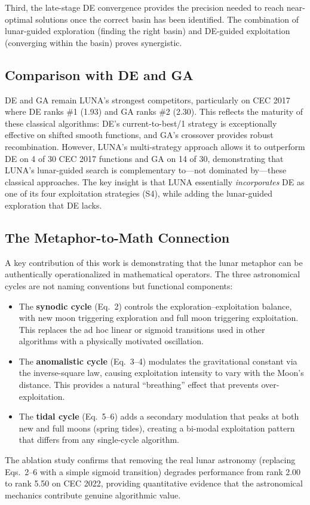 \documentclass[11pt,a4paper]{article}
\begin{document}
Third, the late-stage DE convergence provides the precision needed to reach near-optimal solutions once the correct basin has been identified. The combination of lunar-guided exploration (finding the right basin) and DE-guided exploitation (converging within the basin) proves synergistic.

\subsection{Comparison with DE and GA}

DE and GA remain LUNA's strongest competitors, particularly on CEC 2017 where DE ranks \#1 (1.93) and GA ranks \#2 (2.30). This reflects the maturity of these classical algorithms: DE's current-to-best/1 strategy is exceptionally effective on shifted smooth functions, and GA's crossover provides robust recombination. However, LUNA's multi-strategy approach allows it to outperform DE on 4 of 30 CEC 2017 functions and GA on 14 of 30, demonstrating that LUNA's lunar-guided search is complementary to---not dominated by---these classical approaches. The key insight is that LUNA essentially \emph{incorporates} DE as one of its four exploitation strategies (S4), while adding the lunar-guided exploration that DE lacks.

\subsection{The Metaphor-to-Math Connection}

A key contribution of this work is demonstrating that the lunar metaphor can be authentically operationalized in mathematical operators. The three astronomical cycles are not naming conventions but functional components:
\begin{itemize}[leftmargin=1.5em]
\item The \textbf{synodic cycle} (Eq.~2) controls the exploration--exploitation balance, with new moon triggering exploration and full moon triggering exploitation. This replaces the ad hoc linear or sigmoid transitions used in other algorithms with a physically motivated oscillation.
\item The \textbf{anomalistic cycle} (Eq.~3--4) modulates the gravitational constant via the inverse-square law, causing exploitation intensity to vary with the Moon's distance. This provides a natural ``breathing'' effect that prevents over-exploitation.
\item The \textbf{tidal cycle} (Eq.~5--6) adds a secondary modulation that peaks at both new and full moons (spring tides), creating a bi-modal exploitation pattern that differs from any single-cycle algorithm.
\end{itemize}
The ablation study confirms that removing the real lunar astronomy (replacing Eqs.~2--6 with a simple sigmoid transition) degrades performance from rank 2.00 to rank 5.50 on CEC 2022, providing quantitative evidence that the astronomical mechanics contribute genuine algorithmic value.
\end{document}
